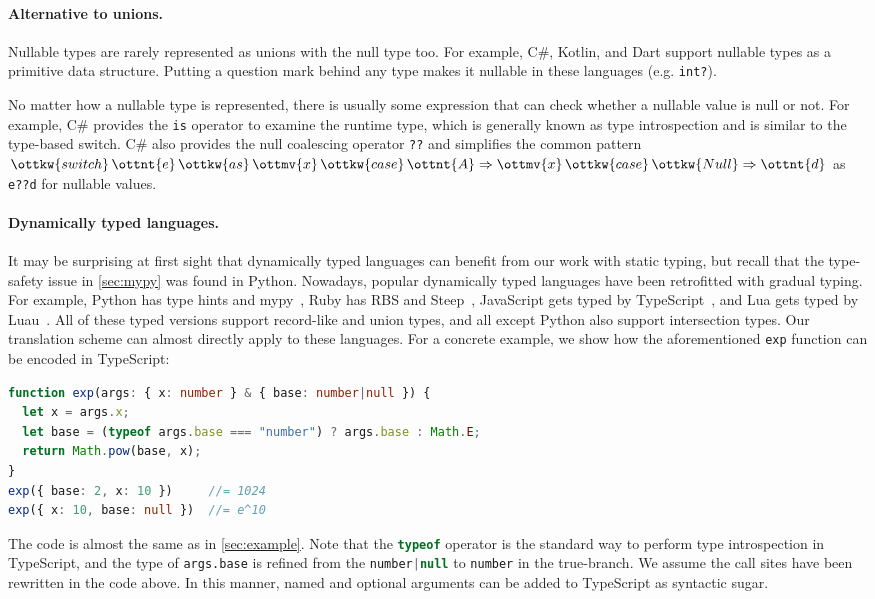 \paragraph{Alternative to unions.}
Nullable types are rarely represented as unions with the null type too. For
example, C\#, Kotlin, and Dart support nullable types as a primitive data
structure. Putting a question mark behind any type makes it nullable in these
languages (e.g. \lstinline{int?}).

No matter how a nullable type is represented, there is usually some expression
that can check whether a nullable value is null or not. For example, C\#
provides the \lstinline[language={[Sharp]C}]{is} operator to examine the runtime
type, which is generally known as type introspection and is similar to the
type-based switch. C\# also provides the null coalescing operator \lstinline{??}
and simplifies the common pattern $\ottkw{switch} \, \ottnt{e} \, \ottkw{as} \, \ottmv{x} \, \ottkw{case} \, \ottnt{A}  \Rightarrow  \ottmv{x} \, \ottkw{case} \, \ottkw{Null}  \Rightarrow  \ottnt{d}$
as \lstinline{e??d} for nullable values.

\paragraph{Dynamically typed languages.}
It may be surprising at first sight that dynamically typed languages can benefit
from our work with static typing, but recall that the type-safety issue in
\autoref{sec:mypy} was found in Python. Nowadays, popular dynamically typed
languages have been retrofitted with gradual typing. For example, Python has
type hints and mypy~\citep{mypy}, Ruby has RBS and Steep~\citep{steep},
JavaScript gets typed by TypeScript~\citep{typescript}, and Lua gets typed by
Luau~\citep{luau}. All of these typed versions support record-like and union
types, and all except Python also support intersection types. Our translation
scheme can almost directly apply to these languages. For a concrete example, we
show how the aforementioned \lstinline{exp} function can be encoded in
TypeScript:
\begin{lstlisting}[language=TypeScript]
function exp(args: { x: number } & { base: number|null }) {
  let x = args.x;
  let base = (typeof args.base === "number") ? args.base : Math.E;
  return Math.pow(base, x);
}
exp({ base: 2, x: 10 })     //= 1024
exp({ x: 10, base: null })  //= e^10
\end{lstlisting}
The code is almost the same as in \autoref{sec:example}. Note that the
\lstinline[language=TypeScript]{typeof} operator is the standard way to perform
type introspection in TypeScript, and the type of \lstinline{args.base} is
refined from the \lstinline[language=TypeScript]{number|null} to
\lstinline[language=TypeScript]{number} in the true-branch. We assume the call
sites have been rewritten in the code above. In this manner, named and optional
arguments can be added to TypeScript as syntactic sugar.

